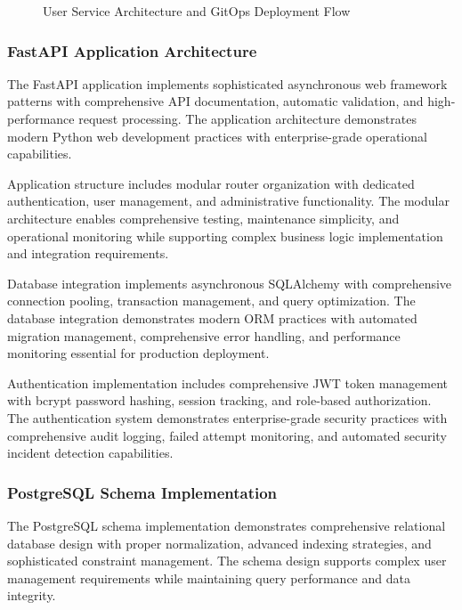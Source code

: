 \begin{figure}[H]
\centering
\caption{User Service Architecture and GitOps Deployment Flow}
\label{fig:user-service-gitops-flow}
\end{figure}

\subsubsection{FastAPI Application Architecture}

The FastAPI application implements sophisticated asynchronous web framework patterns with comprehensive API documentation, automatic validation, and high-performance request processing. The application architecture demonstrates modern Python web development practices with enterprise-grade operational capabilities.

Application structure includes modular router organization with dedicated authentication, user management, and administrative functionality. The modular architecture enables comprehensive testing, maintenance simplicity, and operational monitoring while supporting complex business logic implementation and integration requirements.

Database integration implements asynchronous SQLAlchemy with comprehensive connection pooling, transaction management, and query optimization. The database integration demonstrates modern ORM practices with automated migration management, comprehensive error handling, and performance monitoring essential for production deployment.

Authentication implementation includes comprehensive JWT token management with bcrypt password hashing, session tracking, and role-based authorization. The authentication system demonstrates enterprise-grade security practices with comprehensive audit logging, failed attempt monitoring, and automated security incident detection capabilities.

\subsubsection{PostgreSQL Schema Implementation}

The PostgreSQL schema implementation demonstrates comprehensive relational database design with proper normalization, advanced indexing strategies, and sophisticated constraint management. The schema design supports complex user management requirements while maintaining query performance and data integrity.

